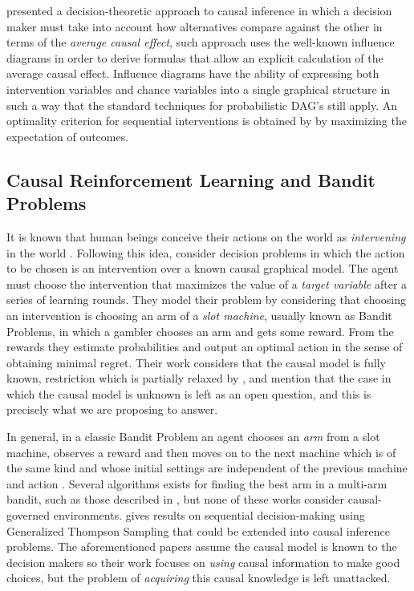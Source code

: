 \documentclass{svjour3}                     %
\begin{document}
\cite{dawid2012decision} presented a decision-theoretic approach to causal inference in which a decision maker must take into account how alternatives compare against the other in terms of the \textit{average causal effect}, such approach uses the well-known influence diagrams \citep{dawid2002influence,dawid2003causal} in order to derive formulas that allow an explicit calculation of the average causal effect. Influence diagrams have the ability of expressing both intervention variables and chance variables into a single graphical structure in such a way that the standard techniques for probabilistic DAG's still apply. An optimality criterion for sequential interventions is obtained by \cite{dawid2008identifying} by maximizing the expectation of outcomes.

\subsection{Causal Reinforcement Learning and Bandit Problems}
It is known that human beings conceive their actions on the world as \textit{intervening} in the world \citep{hagmayer2009decision}. Following this idea, \cite{lattimoreNIPS2016} consider decision problems in which the action to be chosen is an intervention over a known causal graphical model. The agent must choose the intervention that maximizes the value of a \textit{target variable} after a series of learning rounds. They model their problem by considering that choosing an intervention is choosing an arm of a \textit{slot machine}, usually known as Bandit Problems, in which a gambler chooses an arm and gets some reward. From the rewards they estimate probabilities and output an optimal action in the sense of obtaining minimal regret. Their work considers that the causal model is fully known, restriction which is partially relaxed by \cite{sen2017identifying}, and mention that the case in which the causal model is unknown is left as an open question, and this is precisely what we are proposing to answer. 

In general, in a classic Bandit Problem an agent chooses an \textit{arm} from a slot machine, observes a reward and then moves on to the next machine which is of the same kind and whose initial settings are independent of the previous machine and action \citep{sutton1998reinforcement}. Several algorithms exists for finding the best arm in a multi-arm bandit, such as those described in \cite{bubeck2009pure,audibert2010best,gabillon2012best,agarwal2014taming,jamieson2014lil,jamieson2014best,chen2015optimal,carpentier2016tight,russo2016simple,kaufmann2016complexity}, but none of these works consider causal-governed environments. \cite{ortega2014generalized} gives results on sequential decision-making using Generalized Thompson Sampling that could be extended into causal inference problems. The aforementioned papers assume the causal model is known to the decision makers so their work focuses on \textit{using} causal information to make good choices, but the problem of \textit{acquiring} this causal knowledge is left unattacked.
\end{document}
